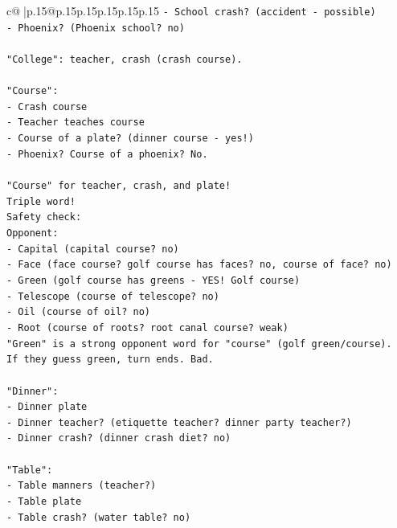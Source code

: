 \documentclass{article}
\begin{document}
{\begin{supertabular}{c@{$\;$}|p{.15\linewidth}@{}p{.15\linewidth}p{.15\linewidth}p{.15\linewidth}p{.15\linewidth}p{.15\linewidth}}
{{{\texttt{{-} School crash? (accident {-} possible)} \\
\texttt{{-} Phoenix? (Phoenix school? no)} \\
\\ 
\texttt{"College": teacher, crash (crash course).} \\
\\ 
\texttt{"Course":} \\
\texttt{{-} Crash course} \\
\texttt{{-} Teacher teaches course} \\
\texttt{{-} Course of a plate? (dinner course {-} yes!)} \\
\texttt{{-} Phoenix? Course of a phoenix? No.} \\
\\ 
\texttt{"Course" for teacher, crash, and plate!} \\
\texttt{Triple word!} \\
\texttt{Safety check:} \\
\texttt{Opponent: } \\
\texttt{{-} Capital (capital course? no)} \\
\texttt{{-} Face (face course? golf course has faces? no, course of face? no)} \\
\texttt{{-} Green (golf course has greens {-} YES! Golf course)} \\
\texttt{{-} Telescope (course of telescope? no)} \\
\texttt{{-} Oil (course of oil? no)} \\
\texttt{{-} Root (course of roots? root canal course? weak)} \\
\texttt{"Green" is a strong opponent word for "course" (golf green/course).} \\
\texttt{If they guess green, turn ends. Bad.} \\
\\ 
\texttt{"Dinner":} \\
\texttt{{-} Dinner plate} \\
\texttt{{-} Dinner teacher? (etiquette teacher? dinner party teacher?)} \\
\texttt{{-} Dinner crash? (dinner crash diet? no)} \\
\\ 
\texttt{"Table":} \\
\texttt{{-} Table manners (teacher?)} \\
\texttt{{-} Table plate} \\
\texttt{{-} Table crash? (water table? no)} \\
}}}
\end{supertabular}}
\end{document}
